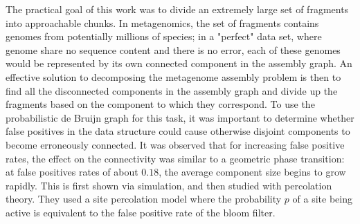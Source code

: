 \documentclass[]{article}
\begin{document}
The practical goal of this work was to divide an extremely large set of fragments into 
approachable chunks. In metagenomics, the set of fragments contains genomes from 
potentially millions of species; in a "perfect" data set, where genome share no sequence 
content and there is no error, each of these genomes would be represented by its own 
connected component in the assembly graph. An effective solution to decomposing the 
metagenome assembly problem is then to find all the disconnected components in the 
assembly graph and divide up the fragments based on the component to which they 
correspond. 
To use the probabilistic de Bruijn graph for this task, it was important to determine 
whether false positives in the data structure could cause otherwise disjoint components 
to become erroneously connected. It was observed that for increasing false positive 
rates, the effect on the connectivity was similar to a geometric phase transition: at 
false positives rates of about $0.18$, the average component size begins to grow rapidly. 
This is first shown via simulation, and then studied with percolation theory. They used a 
site percolation model where the probability $p$ of a site being active is equivalent to 
the false positive rate of the bloom filter. 



\end{document}

